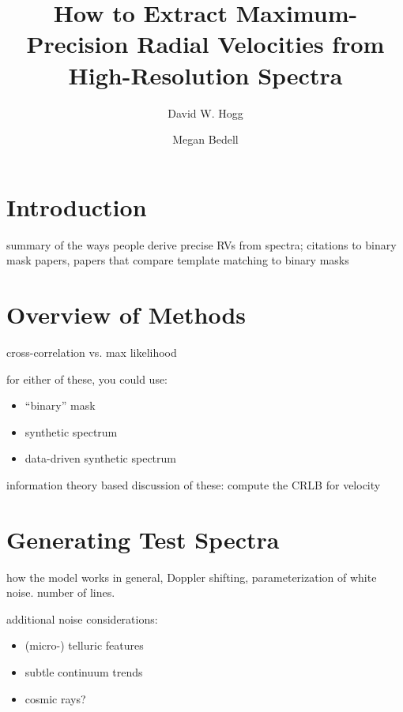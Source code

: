 \documentclass[twocolumn]{aastex61}
\begin{document}
\graphicspath{ {figures/} }

\title{How to Extract Maximum-Precision Radial Velocities from High-Resolution Spectra}

\author{David W. Hogg}

\author{Megan Bedell}

\begin{abstract}

\end{abstract}

\section{Introduction}

summary of the ways people derive precise RVs from spectra; citations to binary mask papers, papers that compare template matching to binary masks

\section{Overview of Methods}

cross-correlation vs. max likelihood

for either of these, you could use:
\begin{itemize}
\item ``binary'' mask
\item synthetic spectrum
\item data-driven synthetic spectrum
\end{itemize}

information theory based discussion of these: compute the CRLB for velocity

\section{Generating Test Spectra}

how the model works in general, Doppler shifting, parameterization of white noise. number of lines.

additional noise considerations:
\begin{itemize}
\item (micro-) telluric features
\item subtle continuum trends
\item cosmic rays?
\end{itemize}
\end{document}
